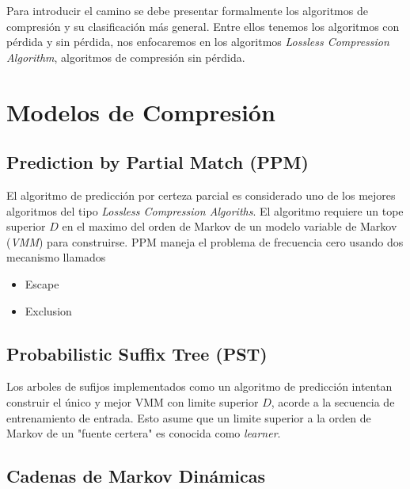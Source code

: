 Para introducir el camino se debe presentar formalmente los algoritmos de compresión y su clasificación más general. Entre ellos tenemos los algoritmos con pérdida y sin pérdida, nos enfocaremos en los algoritmos \emph{Lossless Compression Algorithm}, algoritmos de compresión sin pérdida.









\section{Modelos de Compresión}
 
 \subsection{Prediction by Partial Match (PPM)}
 
	El algoritmo de predicción por certeza parcial es considerado uno de los mejores algoritmos del tipo \emph{Lossless Compression Algoriths}. El algoritmo requiere un tope superior $D$ en el maximo del orden de Markov de un modelo variable de Markov (\emph{VMM}) para construirse. 
	PPM maneja el problema de frecuencia cero usando dos mecanismo  llamados
	
	\begin{itemize}
		\item Escape
		\item Exclusion
	\end{itemize}
	


 \subsection{Probabilistic Suffix Tree (PST)}
 
 Los arboles de sufijos implementados como un algoritmo de predicción intentan construir el único y mejor VMM con limite superior $D$, acorde a la secuencia de entrenamiento de entrada. Esto asume que un limite superior a la orden de Markov de un "fuente certera" es conocida como \emph{learner}.
 
 
 
 \subsection{Cadenas de Markov Dinámicas}
 
